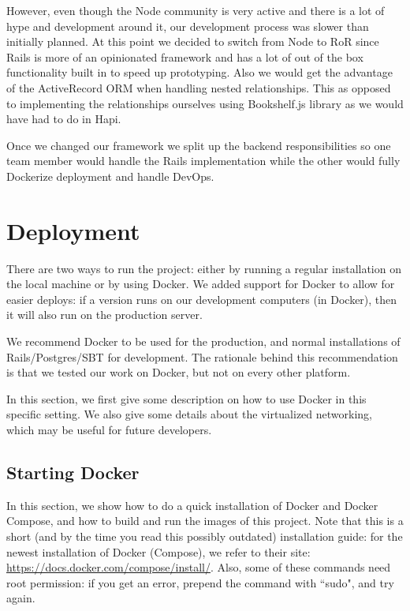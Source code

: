 However, even though the Node community is very active and there is a lot of hype and development around it, our development process was slower than initially planned. At this point we decided to switch from Node to RoR since Rails is more of an opinionated framework and has a lot of out of the box functionality built in to speed up prototyping. Also we would get the advantage of the ActiveRecord ORM when handling nested relationships. This as opposed to implementing the relationships ourselves using Bookshelf.js library as we would have had to do in Hapi.

Once we changed our framework we split up the backend responsibilities so one team member would handle the Rails implementation while the other would fully Dockerize deployment and handle DevOps. 

\section{Deployment}
There are two ways to run the project: either by running a regular installation on the local machine or by using Docker. We added support for Docker to allow for easier deploys: if a version runs on our development computers (in Docker), then it will also run on the production server.

We recommend Docker to be used for the production, and normal installations of Rails/Postgres/SBT for development. The rationale behind this recommendation is that we tested our work on Docker, but not on every other platform.

In this section, we first give some description on how to use Docker in this specific setting. We also give some details about the virtualized networking, which may be useful for future developers.

\subsection{Starting Docker}
In this section, we show how to do a quick installation of Docker and Docker Compose, and how to build and run the images of this project. Note that this is a short (and by the time you read this possibly outdated) installation guide: for the newest installation of Docker (Compose), we refer to their site: \url{https://docs.docker.com/compose/install/}. Also, some of these commands need root permission: if you get an error, prepend the command with ``sudo", and try again.

